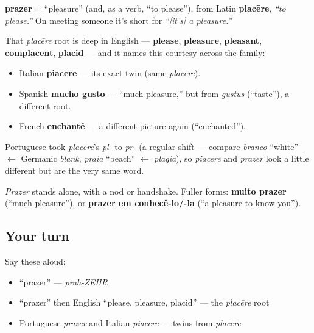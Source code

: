 \begin{cousinweb}
\textbf{prazer} = \textquotedblleft{}pleasure\textquotedblright{} (and, as a verb, \textquotedblleft{}to please\textquotedblright{}), from Latin \textbf{placēre}, \emph{\textquotedblleft{}to please.\textquotedblright{}} On meeting someone it's short for \emph{\textquotedblleft{}{[}it's{]} a pleasure.\textquotedblright{}}

That \emph{placēre} root is deep in English — \textbf{please}, \textbf{pleasure}, \textbf{pleasant}, \textbf{complacent}, \textbf{placid} — and it names this courtesy across the family:

\begin{itemize}
\raggedright
  \item Italian \textbf{piacere} — its exact twin (same \emph{placēre}).
  \item Spanish \textbf{mucho gusto} — \textquotedblleft{}much pleasure,\textquotedblright{} but from \emph{gustus} (\textquotedblleft{}taste\textquotedblright{}), a different root.
  \item French \textbf{enchanté} — a different picture again (\textquotedblleft{}enchanted\textquotedblright{}).
\end{itemize}

Portuguese took \emph{placēre}'s \emph{pl-} to \emph{pr-} (a regular shift — compare \emph{branco} \textquotedblleft{}white\textquotedblright{} $\leftarrow$ Germanic \emph{blank}, \emph{praia} \textquotedblleft{}beach\textquotedblright{} $\leftarrow$ \emph{plagia}), so \emph{piacere} and \emph{prazer} look a little different but are the very same word.
\end{cousinweb}

\begin{grammarlens}[title={Grammar Lens: a one-word courtesy}]
\emph{Prazer} stands alone, with a nod or handshake. Fuller forms: \textbf{muito prazer} (\textquotedblleft{}much pleasure\textquotedblright{}), or \textbf{prazer em conhecê-lo/-la} (\textquotedblleft{}a pleasure to know you\textquotedblright{}).
\end{grammarlens}

\subsection*{Your turn}
Say these aloud:

\begin{itemize}
\raggedright
  \item \textquotedblleft{}prazer\textquotedblright{} — \emph{prah-ZEHR}
  \item \textquotedblleft{}prazer\textquotedblright{} then English \textquotedblleft{}please, pleasure, placid\textquotedblright{} — the \emph{placēre} root
  \item Portuguese \emph{prazer} and Italian \emph{piacere} — twins from \emph{placēre}
\end{itemize}

